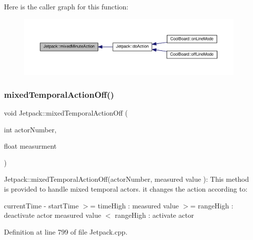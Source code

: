 Here is the caller graph for this function\+:\nopagebreak
\begin{figure}[H]
\begin{center}
\leavevmode
\includegraphics[width=350pt]{df/d1d/class_jetpack_acf8ed1fb594b9e8e224f4ed872a8e093_icgraph}
\end{center}
\end{figure}
\mbox{\label{class_jetpack_af2f567ef6311a8fc2f7bb948837667b7}} 
\subsubsection{\texorpdfstring{mixed\+Temporal\+Action\+Off()}{mixedTemporalActionOff()}}
{\footnotesize\ttfamily void Jetpack\+::mixed\+Temporal\+Action\+Off (\begin{DoxyParamCaption}\item[{int}]{actor\+Number,  }\item[{float}]{measurment }\end{DoxyParamCaption})}

Jetpack\+::mixed\+Temporal\+Action\+Off(actor\+Number, measured value )\+: This method is provided to handle mixed temporal actors. it changes the action according to\+:

current\+Time -\/ start\+Time $>$= time\+High \+: measured value $>$= range\+High \+: deactivate actor measured value $<$ range\+High \+: activate actor 

Definition at line 799 of file Jetpack.\+cpp.


